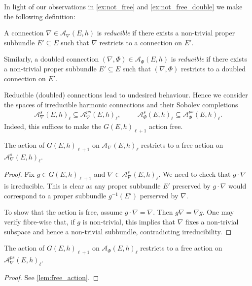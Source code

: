 \documentclass[12pt]{ociamthesis}  %
\begin{document}
In light of our observations in \ref{ex:not_free} and \ref{ex:not_free_double}
we make the following definition:

\begin{definition}
  A connection $\nabla\in \mathcal A_\nabla (E,h)$ is \emph{reducible} if there exists
  a non-trivial proper subbundle $E'\subseteq E$ such that $\nabla$ restricts
  to a connection on $E'$.

  Similarly, a doubled connection $(\nabla,\Phi)\in \mathcal A_\Phi(E,h)$ is
  \emph{reducible} if there exists a non-trivial proper subbundle $E'\subseteq E$
  such that $(\nabla,\Phi)$ restricts to a doubled connection on $E'$.
\end{definition}

Reducible (doubled) connections lead to undesired behaviour.
Hence we
consider the spaces of irreducible harmonic connections and their Sobolev
completions
\begin{align*}
  \mathcal A^s_\nabla(E,h)_\ell \subseteq \mathcal A^{ps}_\nabla(E,h)_\ell,\hspace{1cm}
  \mathcal A^s_\Phi(E,h)_\ell \subseteq \mathcal A^{ps}_\Phi(E,h)_\ell.
\end{align*}
Indeed, this suffices to make the $G(E,h)_{\ell+1}$ action free.

\begin{lemma}\label{lem:free_action}
  The action of $G(E,h)_{\ell+1}$ on $\mathcal A_\nabla(E,h)_\ell$
  restricts to a free action on $\mathcal A^s_\nabla(E,h)_\ell$.
  \begin{proof}
    Fix $g\in G(E,h)_{\ell+1}$ and $\nabla\in \mathcal A^s_\nabla(E,h)_\ell$.
    We need to check that $g\cdot\nabla$ is irreducible. This is clear
    as any proper subbundle $E'$ preserved by $g\cdot\nabla$ would correspond
    to a proper subbundle $g^{-1}(E')$  perserved by $\nabla$.

    To show that the action is free, assume $g\cdot\nabla = \nabla$.
    Then $g\nabla = \nabla g$. One may verify fibre-wise that, if $g$
    is non-trivial, this implies that $\nabla$ fixes a non-trivial
    subspace and hence a non-trivial subbundle, contradicting irreducibility.
  \end{proof}
\end{lemma}

\begin{lemma}
  The action of $G(E,h)_{\ell+1}$ on $\mathcal A_\Phi(E,h)_\ell$
  restricts to a free action on $\mathcal A^{ps}_\nabla(E,h)_\ell$.
  \begin{proof}
    See \ref{lem:free_action}.
  \end{proof}
\end{lemma}
\end{document}
